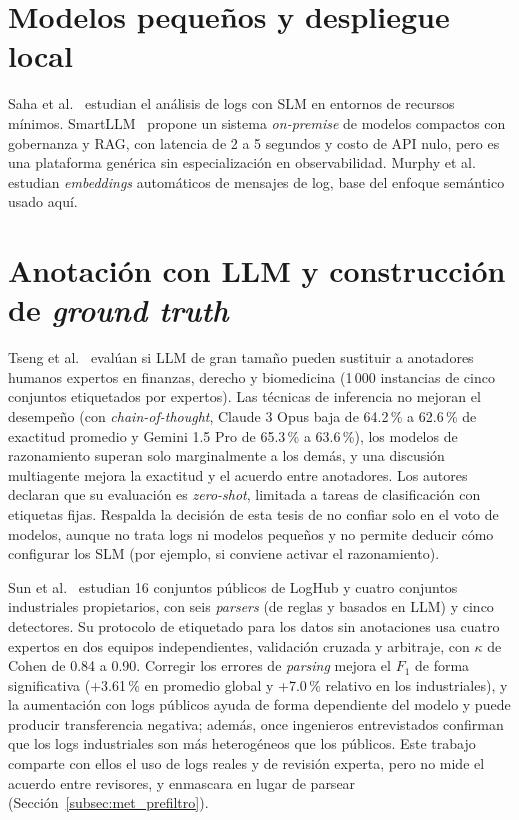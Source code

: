 \section{Modelos pequeños y despliegue local}\label{sec:tr_local}

Saha et al.~\cite{saha2025_slm_minimal} estudian el análisis de logs con SLM en entornos de recursos mínimos. SmartLLM~\cite{pardeshi2026_smartllm} propone un sistema \textit{on-premise} de modelos compactos con gobernanza y RAG, con latencia de 2 a 5 segundos y costo de API nulo, pero es una plataforma genérica sin especialización en observabilidad. Murphy et al.~\cite{murphy2024_embeddings} estudian \textit{embeddings} automáticos de mensajes de log, base del enfoque semántico usado aquí. %

\section{Anotación con LLM y construcción de \textit{ground truth}}\label{sec:tr_anotacion}

Tseng et al.~\cite{tseng2025_expert_annotators} evalúan si LLM de gran tamaño pueden sustituir a anotadores humanos expertos en finanzas, derecho y biomedicina (1\,000 instancias de cinco conjuntos etiquetados por expertos). Las técnicas de inferencia no mejoran el desempeño (con \textit{chain-of-thought}, Claude 3 Opus baja de 64.2\,\% a 62.6\,\% de exactitud promedio y Gemini 1.5 Pro de 65.3\,\% a 63.6\,\%), los modelos de razonamiento superan solo marginalmente a los demás, y una discusión multiagente mejora la exactitud y el acuerdo entre anotadores. Los autores declaran que su evaluación es \textit{zero-shot}, limitada a tareas de clasificación con etiquetas fijas. Respalda la decisión de esta tesis de no confiar solo en el voto de modelos, aunque no trata logs ni modelos pequeños y no permite deducir cómo configurar los SLM (por ejemplo, si conviene activar el razonamiento).

Sun et al.~\cite{sun2026_parsing} estudian 16 conjuntos públicos de LogHub y cuatro conjuntos industriales propietarios, con seis \textit{parsers} (de reglas y basados en LLM) y cinco detectores. Su protocolo de etiquetado para los datos sin anotaciones usa cuatro expertos en dos equipos independientes, validación cruzada y arbitraje, con $\kappa$ de Cohen de 0.84 a 0.90. Corregir los errores de \textit{parsing} mejora el $F_1$ de forma significativa (+3.61\,\% en promedio global y +7.0\,\% relativo en los industriales), y la aumentación con logs públicos ayuda de forma dependiente del modelo y puede producir transferencia negativa; además, once ingenieros entrevistados confirman que los logs industriales son más heterogéneos que los públicos. Este trabajo comparte con ellos el uso de logs reales y de revisión experta, pero no mide el acuerdo entre revisores, y enmascara en lugar de parsear (Sección~\ref{subsec:met_prefiltro}).

